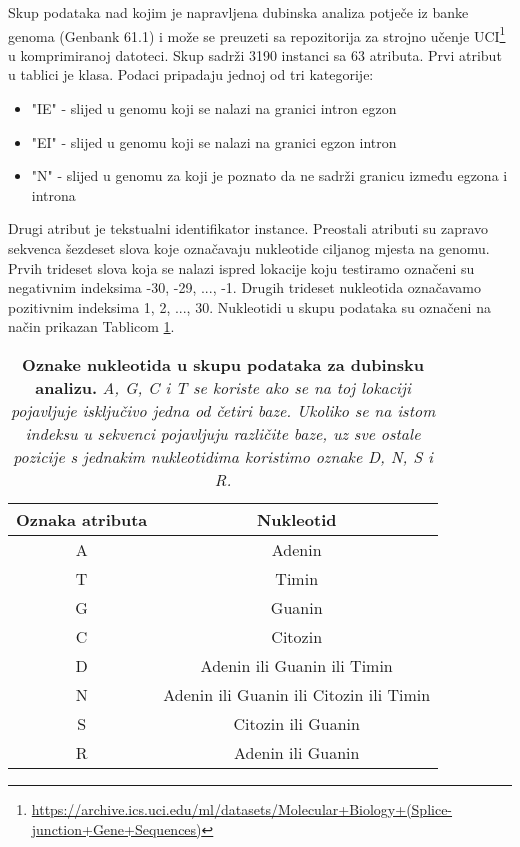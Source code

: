 Skup podataka nad kojim je napravljena dubinska analiza potječe iz banke genoma
(Genbank 61.1) i može se preuzeti sa repozitorija za strojno učenje UCI\footnote
{\url{https://archive.ics.uci.edu/ml/datasets/Molecular+Biology+(Splice-junction+Gene+Sequences)}}
u komprimiranoj datoteci. Skup sadrži 3190 instanci sa 63 atributa.
Prvi atribut u tablici je klasa. Podaci pripadaju jednoj od tri kategorije:
\begin{itemize}
   \item "IE" - slijed u genomu koji se nalazi na granici intron egzon
   \item "EI" - slijed u genomu koji se nalazi na granici egzon intron
   \item "N" - slijed u genomu za koji je poznato da ne sadrži granicu između egzona i introna
\end{itemize}
Drugi atribut je tekstualni identifikator instance.
Preostali atributi su zapravo sekvenca šezdeset slova koje označavaju nukleotide
ciljanog mjesta na genomu. Prvih trideset slova koja se nalazi ispred lokacije koju testiramo
označeni su negativnim indeksima {-30, -29, ..., -1}. Drugih trideset nukleotida označavamo
pozitivnim indeksima {1, 2, ..., 30}.
Nukleotidi u skupu podataka su označeni na način prikazan Tablicom \ref{tab:oznake}.

\begin{table}[!ht]
   \caption[Oznake nukleotida u skupu podataka za dubinsku analizu]{
   \textbf{Oznake nukleotida u skupu podataka za dubinsku analizu.} \textit{A, G, C i T se koriste ako se na
   toj lokaciji pojavljuje isključivo jedna od četiri baze. Ukoliko se na istom indeksu u sekvenci
   pojavljuju različite baze, uz sve ostale pozicije s jednakim nukleotidima koristimo oznake D, N, S i R.}}
   \centering
   \begin{tabular}{||c | c ||}
   \hline
   Oznaka atributa & Nukleotid \\ [0.5ex]
   \hline\hline
   A & Adenin \\
   T & Timin \\ 
   G & Guanin \\ 
   C & Citozin \\
   D & Adenin ili Guanin ili Timin \\
   N & Adenin ili Guanin ili Citozin ili Timin \\
   S & Citozin ili Guanin \\
   R & Adenin ili Guanin \\ [1ex]
   \hline
   \end{tabular}
   \label{tab:oznake}
\end{table}
